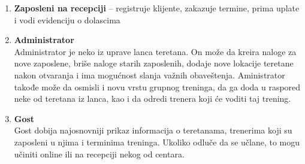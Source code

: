 \documentclass[../main.tex]{subfiles}
\begin{document}
\begin{enumerate}
  \item  \textbf{Zaposleni na recepciji} – registruje klijente, zakazuje termine, prima uplate i vodi evidenciju o dolascima
  \item \textbf{Administrator}\\
  Administrator je neko iz uprave lanca teretana. On može da kreira naloge za nove zaposlene, briše naloge starih zaposlenih, dodaje nove lokacije teretane nakon otvaranja i ima mogućnost slanja važnih obaveštenja. Aministrator takođe može da osmisli i novu vrstu grupnog treninga, da ga doda u raspored neke od teretana iz lanca, kao i da odredi trenera koji će voditi taj trening.
  \item \textbf{Gost} \\
  Gost dobija najosnovniji prikaz informacija o teretanama, trenerima koji su zaposleni u njima i terminima treninga. Ukoliko odluče da se učlane, to mogu učiniti online ili na recepciji nekog od centara.  
\end{enumerate}
\end{document}
